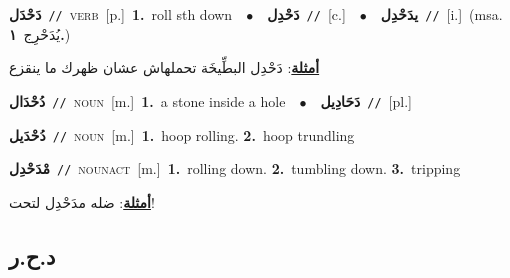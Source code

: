 \documentclass[10pt,a4paper,twoside]{article} %
\begin{document}
\begin{multicols}{2}
{\setlength\topsep{0pt}\textbf{\foreignlanguage{arabic}{دَحْدَل}}\ {\color{gray}\texttt{//}\color{black}}\ \textsc{verb}\ [p.]\ \textbf{1.}~roll sth down\ \ $\bullet$\ \ \setlength\topsep{0pt}\textbf{\foreignlanguage{arabic}{دَحْدِل}}\ {\color{gray}\texttt{//}\color{black}}\ [c.]\ \ $\bullet$\ \ \setlength\topsep{0pt}\textbf{\foreignlanguage{arabic}{يدَحْدِل}}\ {\color{gray}\texttt{//}\color{black}}\ [i.]\ \color{gray}(msa. \foreignlanguage{arabic}{يُدَحْرِج}~\foreignlanguage{arabic}{\textbf{١.}})\color{black}\  \begin{flushright}\color{gray}\foreignlanguage{arabic}{\textbf{\underline{\foreignlanguage{arabic}{أمثلة}}}: دَحْدِل البطِّيخَة تحملهاش عشان ظهرك ما ينقزع}\end{flushright}\color{black}} \vspace{2mm}

{\setlength\topsep{0pt}\textbf{\foreignlanguage{arabic}{دُحْدَال}}\ {\color{gray}\texttt{//}\color{black}}\ \textsc{noun}\ [m.]\ \textbf{1.}~a stone inside a hole\ \ $\bullet$\ \ \setlength\topsep{0pt}\textbf{\foreignlanguage{arabic}{دَحَادِيل}}\ {\color{gray}\texttt{//}\color{black}}\ [pl.]\ } \vspace{2mm}

{\setlength\topsep{0pt}\textbf{\foreignlanguage{arabic}{دُحْدَيل}}\ {\color{gray}\texttt{//}\color{black}}\ \textsc{noun}\ [m.]\ \textbf{1.}~hoop rolling.  \textbf{2.}~hoop trundling\ } \vspace{2mm}

{\setlength\topsep{0pt}\textbf{\foreignlanguage{arabic}{مْدَحْدِل}}\ {\color{gray}\texttt{//}\color{black}}\ \textsc{noun\textunderscore act}\ [m.]\ \textbf{1.}~rolling down.  \textbf{2.}~tumbling down.  \textbf{3.}~tripping\  \begin{flushright}\color{gray}\foreignlanguage{arabic}{\textbf{\underline{\foreignlanguage{arabic}{أمثلة}}}: ضله مدَحْدِل لتحت!}\end{flushright}\color{black}} \vspace{2mm}

\vspace{-3mm}
\subsection*{\color{blue}\foreignlanguage{arabic}{د.ح.ر}\color{blue}{}} 


\end{multicols}
\end{document}
